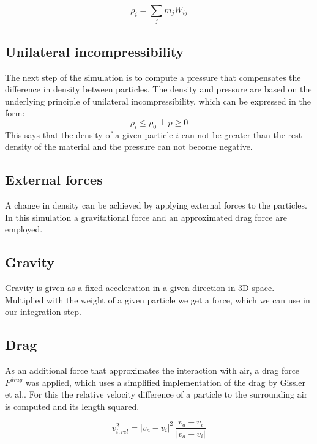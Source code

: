 \documentclass[intern]{cgMA}
\begin{document}
    \begin{equation}
        \rho_i = \sum_j m_j W_{ij}
    \end{equation}

    \subsection{Unilateral incompressibility}  
    The next step of the simulation is to compute a pressure that compensates the difference in density between particles. The density and pressure are based on the underlying principle of unilateral incompressibility, which can be expressed in the form: 
    \begin{equation}
        \rho_i \leq \rho_0 \; \bot \;  p \geq 0
    \end{equation}
    This says that the density of a given particle $i$ can not be greater than the rest density of the material and the pressure can not become negative. \cite{10.1145/2019406.2019410}

    \subsection{External forces}
    A change in density can be achieved by applying external forces to the particles. In this simulation a gravitational force and an approximated drag force are employed.
    \subsection{Gravity}
    Gravity is given as a fixed acceleration in a given direction in 3D space. Multiplied with the weight of a given particle we get a force, which we can use in our integration step.
    \subsection{Drag}
    As an additional force that approximates the interaction with air, a drag force $F^{drag}$ was applied, which uses a simplified implementation of the drag by Gissler et al.\cite{10.1016/j.cag.2017.09.002}. For this the relative velocity difference of a particle to the surrounding air is computed and its length squared. 

    \begin{equation}
        \label{eq:v_rel}
        v^2_{i,rel} = |v_a - v_i|^2\ \frac{v_a - v_i}{|v_a - v_i|}
    \end{equation}
\end{document}
